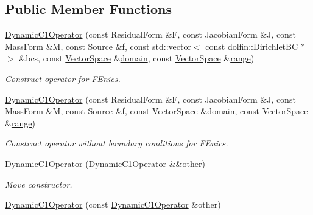 \subsection*{Public Member Functions}
\begin{DoxyCompactItemize}
\item 
\hyperlink{classSpacy_1_1FEniCS_1_1DynamicC1Operator_ab440c499ca9067d3f0433516f0289b52_ab440c499ca9067d3f0433516f0289b52}{Dynamic\+C1\+Operator} (const Residual\+Form \&F, const Jacobian\+Form \&J, const Mass\+Form \&M, const Source \&f, const std\+::vector$<$ const dolfin\+::\+Dirichlet\+B\+C $\ast$ $>$ \&bcs, const \hyperlink{classSpacy_1_1VectorSpace}{Vector\+Space} \&\hyperlink{classSpacy_1_1OperatorBase_a2588f9b3e0188820c4c494e63293dc6f_a2588f9b3e0188820c4c494e63293dc6f}{domain}, const \hyperlink{classSpacy_1_1VectorSpace}{Vector\+Space} \&\hyperlink{classSpacy_1_1OperatorBase_ab19d3b7a6f290b1079248f1e567e53d6_ab19d3b7a6f290b1079248f1e567e53d6}{range})
\begin{DoxyCompactList}\small\item\em Construct operator for F\+Enics. \end{DoxyCompactList}\item 
\hyperlink{classSpacy_1_1FEniCS_1_1DynamicC1Operator_ad33575a9846f50cdc361ae06c0170437_ad33575a9846f50cdc361ae06c0170437}{Dynamic\+C1\+Operator} (const Residual\+Form \&F, const Jacobian\+Form \&J, const Mass\+Form \&M, const Source \&f, const \hyperlink{classSpacy_1_1VectorSpace}{Vector\+Space} \&\hyperlink{classSpacy_1_1OperatorBase_a2588f9b3e0188820c4c494e63293dc6f_a2588f9b3e0188820c4c494e63293dc6f}{domain}, const \hyperlink{classSpacy_1_1VectorSpace}{Vector\+Space} \&\hyperlink{classSpacy_1_1OperatorBase_ab19d3b7a6f290b1079248f1e567e53d6_ab19d3b7a6f290b1079248f1e567e53d6}{range})
\begin{DoxyCompactList}\small\item\em Construct operator without boundary conditions for F\+Enics. \end{DoxyCompactList}\item 
\hyperlink{classSpacy_1_1FEniCS_1_1DynamicC1Operator_a71ff4c905e40b4f49ae613ca38992ab7_a71ff4c905e40b4f49ae613ca38992ab7}{Dynamic\+C1\+Operator} (\hyperlink{classSpacy_1_1FEniCS_1_1DynamicC1Operator}{Dynamic\+C1\+Operator} \&\&other)
\begin{DoxyCompactList}\small\item\em Move constructor. \end{DoxyCompactList}\item 
\hyperlink{classSpacy_1_1FEniCS_1_1DynamicC1Operator_afda8434355118ad60d2711a14cd334e7_afda8434355118ad60d2711a14cd334e7}{Dynamic\+C1\+Operator} (const \hyperlink{classSpacy_1_1FEniCS_1_1DynamicC1Operator}{Dynamic\+C1\+Operator} \&other)

\end{DoxyCompactItemize}
